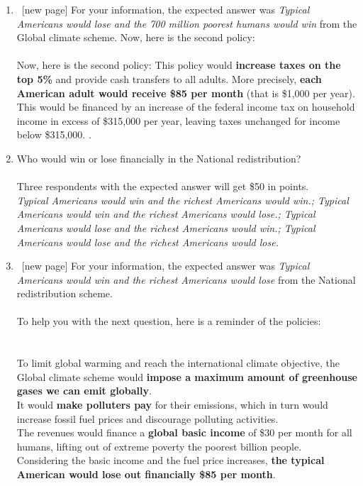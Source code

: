 \begin{enumerate}[resume]
\item ~[new page] For your information, the expected answer was \textit{Typical Americans would lose and the 700 million poorest humans would win} from the Global climate scheme. Now, here is the second policy: \\ 
\\
Now, here is the second policy:  \textbf{} This policy would \textbf{increase taxes on the top 5\%} and provide cash transfers to all adults. More precisely, \textbf{each American adult would receive \$85 per month} (that is \$1,000 per year). This would be financed by an increase of the federal income tax on household income in excess of \$315,000 per year, leaving taxes unchanged for income below \$315,000. .
\item Who would win or lose financially in the National redistribution? \\
\\
Three respondents with the expected answer will get \$50 in points.
\\ \textit{Typical Americans would win and the richest Americans would win.; Typical Americans would win and the richest Americans would lose.; Typical Americans would lose and the richest Americans would win.; Typical Americans would lose and the richest Americans would lose.}
\item ~[new page] For your information, the expected answer was \textit{Typical Americans would win and the richest Americans would lose} from the National redistribution scheme. \\ 
\\
To help you with the next question, here is a reminder of the policies:\\
\\
\textbf{}\\ 
To limit global warming and reach the international climate objective, the Global climate scheme would \textbf{impose a maximum amount of greenhouse gases we can emit globally}.\\
It would \textbf{make polluters pay} for their emissions, which in turn would increase fossil fuel prices and discourage polluting activities.\\
The revenues would finance a \textbf{global basic income} of \$30 per month for all humans, lifting out of extreme poverty the poorest billion people.\\
Considering the basic income and the fuel price increases, \textbf{the typical American would lose out financially \$85 per month}.\\

\end{enumerate}
